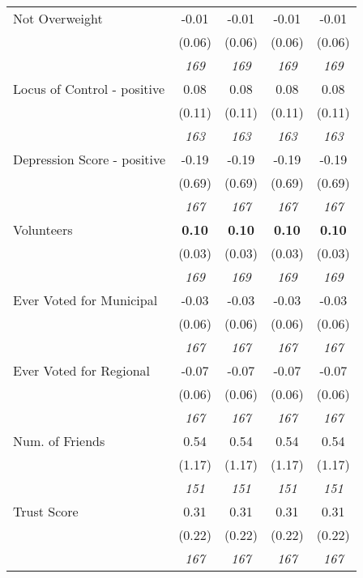 \begin{tabular}{l c c c c}
Not Overweight & -0.01 & -0.01 & -0.01 & -0.01 \\
& (0.06) & (0.06) & (0.06) & (0.06) \\
& \textit{ 169 } & \textit{ 169 } & \textit{ 169 } & \textit{ 169 } \\
Locus of Control - positive & 0.08 & 0.08 & 0.08 & 0.08 \\
& (0.11) & (0.11) & (0.11) & (0.11) \\
& \textit{ 163 } & \textit{ 163 } & \textit{ 163 } & \textit{ 163 } \\
Depression Score - positive & -0.19 & -0.19 & -0.19 & -0.19 \\
& (0.69) & (0.69) & (0.69) & (0.69) \\
& \textit{ 167 } & \textit{ 167 } & \textit{ 167 } & \textit{ 167 } \\
Volunteers & \textbf{ 0.10 } & \textbf{ 0.10 } & \textbf{ 0.10 } & \textbf{ 0.10 } \\
& (0.03) & (0.03) & (0.03) & (0.03) \\
& \textit{ 169 } & \textit{ 169 } & \textit{ 169 } & \textit{ 169 } \\
Ever Voted for Municipal & -0.03 & -0.03 & -0.03 & -0.03 \\
& (0.06) & (0.06) & (0.06) & (0.06) \\
& \textit{ 167 } & \textit{ 167 } & \textit{ 167 } & \textit{ 167 } \\
Ever Voted for Regional & -0.07 & -0.07 & -0.07 & -0.07 \\
& (0.06) & (0.06) & (0.06) & (0.06) \\
& \textit{ 167 } & \textit{ 167 } & \textit{ 167 } & \textit{ 167 } \\
Num. of Friends & 0.54 & 0.54 & 0.54 & 0.54 \\
& (1.17) & (1.17) & (1.17) & (1.17) \\
& \textit{ 151 } & \textit{ 151 } & \textit{ 151 } & \textit{ 151 } \\
Trust Score & 0.31 & 0.31 & 0.31 & 0.31 \\
& (0.22) & (0.22) & (0.22) & (0.22) \\
& \textit{ 167 } & \textit{ 167 } & \textit{ 167 } & \textit{ 167 } \\
\bottomrule
\end{tabular}
